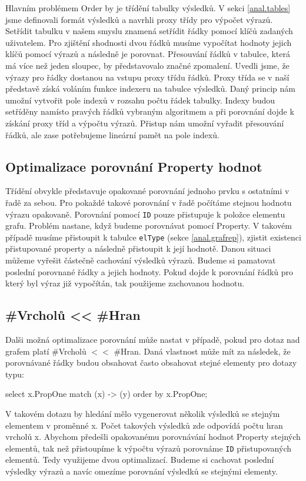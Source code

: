 Hlavním problémem Order by je třídění tabulky výsledků.
V sekci \ref{anal.tables} jsme definovali formát výsledků a navrhli proxy třídy pro výpočet výrazů.
Setřídit tabulku v našem smyslu znamená setřídit řádky pomocí klíčů zadaných uživatelem.
Pro zjištění shodnosti dvou řádků musíme vypočítat hodnoty jejich klíčů pomocí výrazů a následně je porovnat.
Přesouvání řádků v tabulce, která má více než jeden sloupec, by představovalo značné zpomalení.
Uvedli jsme, že výrazy pro řádky dostanou na vstupu proxy třídu řádků.
Proxy třída se v naší představě získá voláním funkce indexeru na tabulce výsledků.
Daný princip nám umožní vytvořit pole indexů v rozsahu počtu řádek tabulky.
Indexy budou setříděny namísto pravých řádků vybraným algoritmem a při porovnání dojde k získání proxy tříd a výpočtu výrazů.
Přistup nám umožní vyřadit přesouvání řádků, ale zase potřebujeme lineární pamět na pole indexů.

\subsection{Optimalizace porovnání Property hodnot}

Třídění obvykle představuje opakované porovnání jednoho prvku s ostatními v řadě za sebou.
Pro pokaždé takové porovnání v řadě počítáme stejnou hodnotu výrazu opakovaně.
Porovnání pomocí \texttt{ID} pouze přistupuje k položce elementu grafu.
Problém nastane, když budeme porovnávat pomocí Property.
V takovém případě musíme přistoupit k tabulce \texttt{elType} (sekce \ref{anal.grafrep}), zjistit existenci přistupované property a následně přistoupit k její hodnotě.
Danou situaci můžeme vyřešit částečně cachování výsledků výrazů.
Budeme si pamatovat poslední porovnané řádky a jejich hodnoty.
Pokud dojde k porovnání řádků pro který byl výraz již vypočítán, tak použijeme zachovanou hodnotu.

\subsection{\#Vrcholů << \#Hran}

Dalši možná optimalizace porovnání může nastat v případě, pokud pro dotaz nad grafem platí \#Vrcholů $<<$ \#Hran.
Daná vlastnost může mít za následek, že porovnávané řádky budou obsahovat často obsahovat stejné elementy pro dotazy typu:
\begin{code}
select x.PropOne match (x) -> (y) order by x.PropOne;
\end{code}
V takovém dotazu by hledání mělo vygenerovat několik výsledků se stejným elementem v proměnné x.
Počet takových výsledků zde odpovídá počtu hran vrcholů x.
Abychom předešli opakovanému porovnávání hodnot Property stejných elementů, tak než přistoupíme k výpočtu výrazů porovnáme \texttt{ID} přistupovaných elementů.
Tedy využijeme dvou optimalizací.
Budeme si cachovat poslední výsledky výrazů a navíc omezíme porovnání výsledků se stejnými elementy.

